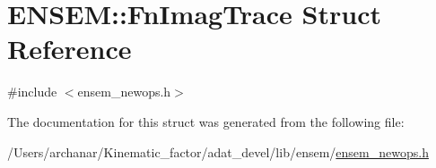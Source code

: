 \hypertarget{structENSEM_1_1FnImagTrace}{}\section{E\+N\+S\+EM\+:\+:Fn\+Imag\+Trace Struct Reference}
\label{structENSEM_1_1FnImagTrace}


{\ttfamily \#include $<$ensem\+\_\+newops.\+h$>$}



The documentation for this struct was generated from the following file\+:\begin{DoxyCompactItemize}
\item 
/\+Users/archanar/\+Kinematic\+\_\+factor/adat\+\_\+devel/lib/ensem/\mbox{\hyperlink{lib_2ensem_2ensem__newops_8h}{ensem\+\_\+newops.\+h}}\end{DoxyCompactItemize}
